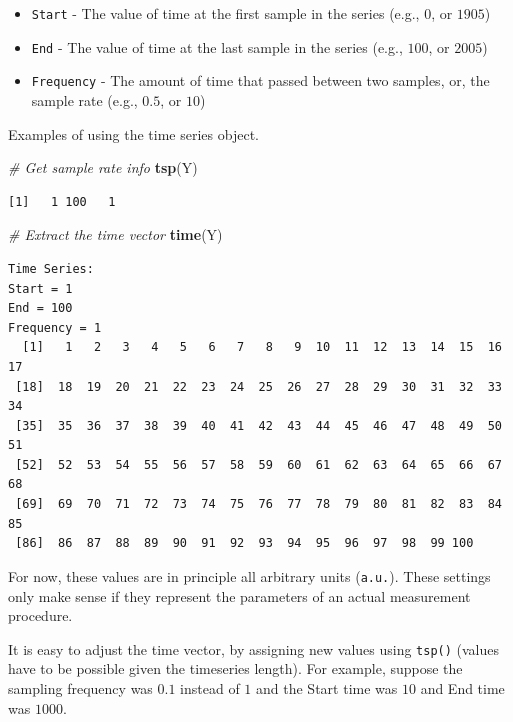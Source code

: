 \documentclass[]{book}
\newenvironment{Shaded}{\begin{snugshade}}{\end{snugshade}}
\newcommand{\KeywordTok}[1]{\textcolor[rgb]{0.13,0.29,0.53}{\textbf{{#1}}}}
\newcommand{\CommentTok}[1]{\textcolor[rgb]{0.56,0.35,0.01}{\textit{{#1}}}}
\newcommand{\NormalTok}[1]{{#1}}
\providecommand{\tightlist}{%
  \setlength{\itemsep}{0pt}\setlength{\parskip}{0pt}}
\begin{document}
\begin{itemize}
\tightlist
\item
  \texttt{Start} - The value of time at the first sample in the series
  (e.g., \(0\), or \(1905\))
\item
  \texttt{End} - The value of time at the last sample in the series
  (e.g., \(100\), or \(2005\))
\item
  \texttt{Frequency} - The amount of time that passed between two
  samples, or, the sample rate (e.g., \(0.5\), or \(10\))
\end{itemize}

Examples of using the time series object.

\begin{Shaded}
\begin{Highlighting}[]
\CommentTok{# Get sample rate info}
\KeywordTok{tsp}\NormalTok{(Y)}
\end{Highlighting}
\end{Shaded}

\begin{verbatim}
[1]   1 100   1
\end{verbatim}

\begin{Shaded}
\begin{Highlighting}[]
\CommentTok{# Extract the time vector}
\KeywordTok{time}\NormalTok{(Y)}
\end{Highlighting}
\end{Shaded}

\begin{verbatim}
Time Series:
Start = 1 
End = 100 
Frequency = 1 
  [1]   1   2   3   4   5   6   7   8   9  10  11  12  13  14  15  16  17
 [18]  18  19  20  21  22  23  24  25  26  27  28  29  30  31  32  33  34
 [35]  35  36  37  38  39  40  41  42  43  44  45  46  47  48  49  50  51
 [52]  52  53  54  55  56  57  58  59  60  61  62  63  64  65  66  67  68
 [69]  69  70  71  72  73  74  75  76  77  78  79  80  81  82  83  84  85
 [86]  86  87  88  89  90  91  92  93  94  95  96  97  98  99 100
\end{verbatim}

For now, these values are in principle all arbitrary units
(\texttt{a.u.}). These settings only make sense if they represent the
parameters of an actual measurement procedure.

It is easy to adjust the time vector, by assigning new values using
\texttt{tsp()} (values have to be possible given the timeseries length).
For example, suppose the sampling frequency was \(0.1\) instead of \(1\)
and the Start time was \(10\) and End time was \(1000\).
\end{document}
